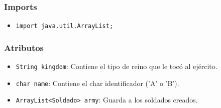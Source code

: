 \documentclass{article}
\begin{document}
\subsubsection{Imports}
\begin{itemize}
    \item \texttt{import java.util.ArrayList;}
\end{itemize}


\subsubsection{Atributos}
\begin{itemize}
    \item \texttt{String kingdom}: Contiene el tipo de reino que le tocó al ejército.
    \item \texttt{char name}: Contiene el char identificador ('A' o 'B').
    \item \texttt{ArrayList<Soldado> army}: Guarda a los soldados creados.
\end{itemize}

\end{document}
